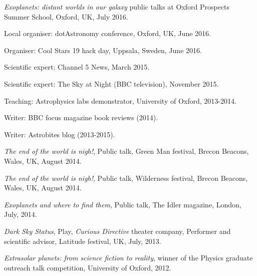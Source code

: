 \documentclass[12pt,letterpaper]{article}
\begin{document}
\begin{list}{}{\cvlist}
\item
{\it Exoplanets: distant worlds in our galaxy} public talks at Oxford
Prospects Summer School, Oxford, UK, July 2016.
\item
Local organiser: dotAstronomy conference, Oxford, UK, June 2016.
\item
Organiser: Cool Stars 19 hack day, Uppsala, Sweden, June 2016.
\item
Scientific expert: Channel 5 News, March 2015.
\item
Scientific expert: The Sky at Night (BBC television), November 2015.
\item
Teaching: Astrophysics labs demonstrator, University of Oxford, 2013-2014.
\item
Writer: BBC focus magazine book reviews (2014).
\item
Writer: Astrobites blog (2013-2015).
\item
{\it The end of the world is nigh!}, Public talk, Green Man festival, Brecon
Beacons, Wales, UK, August 2014.
\item
{\it The end of the world is nigh!}, Public talk, Wilderness festival, Brecon
Beacons, Wales, UK, August 2014.
\item
{\it Exoplanets and where to find them}, Public talk, The Idler magazine,
London, July, 2014.
\item
{\it Dark Sky Status}, Play, {\it Curious Directive} theater company,
Performer and scientific advisor, Latitude festival, UK, July, 2013.
\item
{\it Extrasolar planets: from science fiction to reality}, winner of the
Physics graduate outreach talk competition, University of Oxford, 2012.
\end{list}

\ifdefined\withpubs
    \begin{list}{}{\cvlist}
    
    \end{list}
\fi

\ifdefined\withpubs
    \begin{list}{}{\cvlist}
    
    \end{list}
\fi
\end{document}
